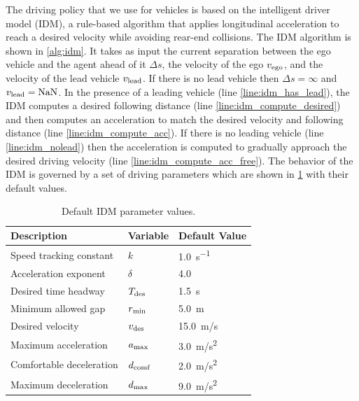 The driving policy that we use for vehicles is based on the intelligent driver model (IDM), a rule-based algorithm that applies longitudinal acceleration to reach a desired velocity while avoiding rear-end collisions. The IDM algorithm is shown in \cref{alg:idm}. It takes as input the current separation between the ego vehicle and the agent ahead of it $\Delta s$, the velocity of the ego $v_{\rm ego}$, and the velocity of the lead vehicle $v_{\rm lead}$. If there is no lead vehicle then $\Delta s = \infty$ and $v_{\rm lead} = {\rm NaN}$. In the presence of a leading vehicle (line \ref{line:idm_has_lead}), the IDM computes a desired following distance (line \ref{line:idm_compute_desired}) and then computes an acceleration to match the desired velocity and following distance (line \ref{line:idm_compute_acc}). If there is no leading vehicle (line \ref{line:idm_nolead}) then the acceleration is computed to gradually approach the desired driving velocity (line \ref{line:idm_compute_acc_free}). The behavior of the IDM is governed by a set of driving parameters which are shown in \cref{tab:idm_params} with their default values. 


\begin{table}
    \centering
    \caption{Default IDM parameter values.}
    \label{tab:idm_params}
    \begin{tabular}{@{}lll@{}} 
        \toprule
        \textbf{Description} & \textbf{Variable} & \textbf{Default Value} \\
        \midrule
        Speed tracking constant & $k$ & \SI{1.0}{s^{-1}} \\
        Acceleration exponent & $\delta$ & \num{4.0} \\
        Desired time headway & $T_{\rm des}$ & \SI{1.5}{s}\\
        Minimum allowed gap & $r_{\rm min}$ & \SI{5.0}{m} \\
        Desired velocity & $v_{\rm des}$ & \SI{15.0}{m/s} \\
        Maximum acceleration & $a_{\rm max}$ & \SI{3.0}{m/s^2} \\
        Comfortable deceleration & $d_{\rm comf}$ & \SI{2.0}{m/s^2} \\
        Maximum deceleration & $d_{\rm max}$ & \SI{9.0}{m/s^2} \\
        \bottomrule
    \end{tabular}
    \vskip -0.2in
\end{table}


